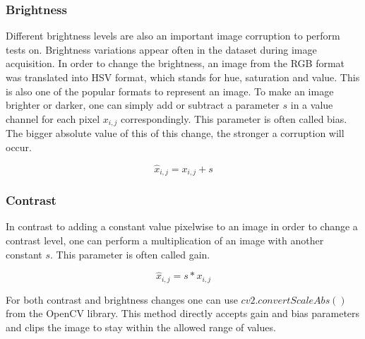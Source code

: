 \subsubsection{Brightness}
Different brightness levels are also an important image corruption to perform tests on. Brightness variations appear often in the dataset during image acquisition. In order to change the brightness, an image from the RGB format was translated into HSV format, which stands for hue, saturation and value. This is also one of the popular formats to represent an image. To make an image brighter or darker, one can simply add or subtract a parameter $s$ in a value channel for each pixel $x_{i,j}$ correspondingly. This parameter is often called bias. The bigger absolute value of this of this change, the stronger a corruption will occur.

\begin{equation}
    \hat{x}_{i, j} = x_{i, j} + s
\end{equation}

\subsubsection{Contrast}
In contrast to adding a constant value pixelwise to an image in order to change a contrast level, one can perform a multiplication of an image with another constant $s$. This parameter is often called gain.

\begin{equation}
    \hat{x}_{i, j} = s * x_{i, j}
\end{equation}

For both contrast and brightness changes one can use $cv2.convertScaleAbs()$ from the OpenCV library. This method directly accepts gain and bias parameters and clips the image to stay within the allowed range of values.

